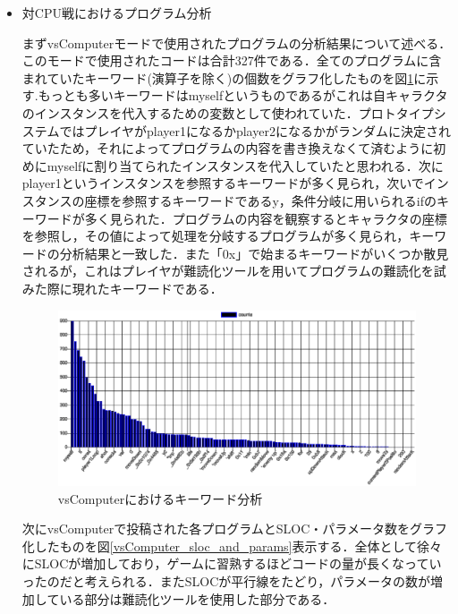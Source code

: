 \begin{itemize}
  \item 対CPU戦におけるプログラム分析


  まずvsComputerモードで使用されたプログラムの分析結果について述べる．このモードで使用されたコードは合計327件である．全てのプログラムに含まれていたキーワード(演算子を除く)の個数をグラフ化したものを図\ref{vsComputer_keyword}に示す.もっとも多いキーワードはmyselfというものであるがこれは自キャラクタのインスタンスを代入するための変数として使われていた．プロトタイプシステムではプレイヤがplayer1になるかplayer2になるかがランダムに決定されていたため，それによってプログラムの内容を書き換えなくて済むように初めにmyselfに割り当てられたインスタンスを代入していたと思われる．次にplayer1というインスタンスを参照するキーワードが多く見られ，次いでインスタンスの座標を参照するキーワードであるy，条件分岐に用いられるifのキーワードが多く見られた．プログラムの内容を観察するとキャラクタの座標を参照し，その値によって処理を分岐するプログラムが多く見られ，キーワードの分析結果と一致した．また「0x」で始まるキーワードがいくつか散見されるが，これはプレイヤが難読化ツールを用いてプログラムの難読化を試みた際に現れたキーワードである．

  \begin{figure}[!ht]
    \begin{center}
      \includegraphics[width=1.0\linewidth]{image/vsComputer_result.eps}
    \end{center}
      \vspace{-8mm} 
    \caption{vsComputerにおけるキーワード分析}
    \label{vsComputer_keyword}
  \end{figure}

  次にvsComputerで投稿された各プログラムとSLOC・パラメータ数をグラフ化したものを図\ref{vsComputer_sloc_and_params}表示する．全体として徐々にSLOCが増加しており，ゲームに習熟するほどコードの量が長くなっていったのだと考えられる．またSLOCが平行線をたどり，パラメータの数が増加している部分は難読化ツールを使用した部分である．



\end{itemize}
